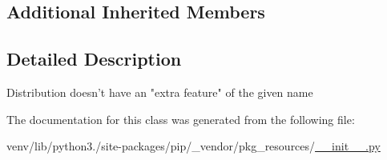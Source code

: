 \subsection*{Additional Inherited Members}


\subsection{Detailed Description}
\begin{DoxyVerb}Distribution doesn't have an "extra feature" of the given name\end{DoxyVerb}
 

The documentation for this class was generated from the following file\+:\begin{DoxyCompactItemize}
\item 
venv/lib/python3./site-\/packages/pip/\+\_\+vendor/pkg\+\_\+resources/\hyperlink{venv_2lib_2python3_89_2site-packages_2pip_2__vendor_2pkg__resources_2____init_____8py}{\+\_\+\+\_\+init\+\_\+\+\_\+.\+py}\end{DoxyCompactItemize}
